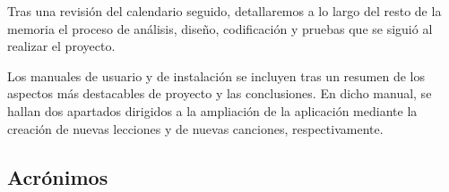Tras una revisión del calendario seguido, detallaremos a lo largo del
resto de la memoria el proceso de análisis, diseño, codificación y
pruebas que se siguió al realizar el proyecto.  

Los manuales de usuario y de instalación se incluyen tras un resumen
de los aspectos más destacables de proyecto y las conclusiones. En
dicho manual, se hallan dos apartados dirigidos a la ampliación de la
aplicación mediante la creación de nuevas lecciones y de nuevas
canciones, respectivamente.

\subsection{Acrónimos}




